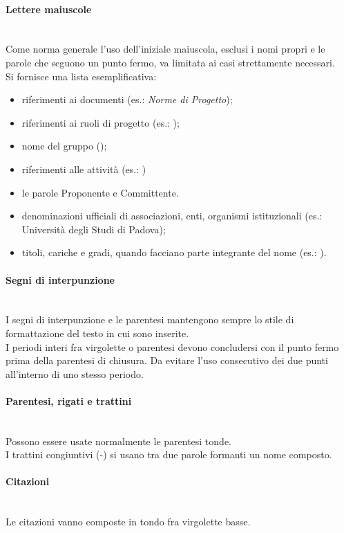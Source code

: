 \paragraph{Lettere maiuscole}\label{sec:lettere_maiuscole} \mbox{} \\
Come norma generale l'uso dell'iniziale maiuscola, esclusi i nomi propri e le parole che seguono un punto fermo, va limitata ai casi strettamente necessari.\\
Si fornisce una lista esemplificativa:
\begin{itemize}
	\item riferimenti ai documenti (es.: \textit{Norme di Progetto});
	\item riferimenti ai ruoli di progetto (es.: \Amministratore{});
	\item nome del gruppo (\GroupName);
	\item riferimenti alle attività (es.: \VV) 
	\item le parole Proponente e Committente.
	\item denominazioni ufficiali di associazioni, enti, organismi istituzionali (es.: Università degli Studi di Padova);
	\item titoli, cariche e gradi, quando facciano parte integrante del nome (es.: \CommittenteInline).
\end{itemize}

\paragraph{Segni di interpunzione} \mbox{} \\
I segni di interpunzione e le parentesi mantengono sempre lo stile di formattazione del testo in cui sono inserite.\\
I periodi interi fra virgolette o parentesi devono concludersi con il punto fermo prima della parentesi di chiusura.
Da evitare l’uso consecutivo dei due punti all'interno di uno stesso periodo.

\paragraph{Parentesi, rigati e trattini} \mbox{} \\
Possono essere usate normalmente le parentesi tonde.\\
I trattini congiuntivi (-) si usano tra due parole formanti un nome composto.

\paragraph{Citazioni} \mbox{} \\
Le citazioni vanno composte in tondo fra virgolette basse.

